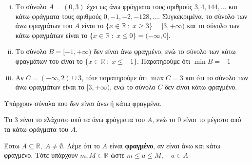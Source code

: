 \begin{example}
\item {}
  \begin{enumerate}[(i)]
    \item Το  σύνολο $ A = (0,3) $  έχει ως άνω φράγματα τους αριθμούς 
      $ 3, 4, 144, \ldots$ και κάτω φράγματα τους αριθμούς
      $ 0, -1, -2, -128, \ldots $. Συγκεκριμένα, το σύνολο των άνω φραγμάτων του 
      $A$ είναι το $ \{ x \in \mathbb{R} \; : \; x \geq 3 \} = [3,+\infty) $ και 
      το σύνολο των κάτω φραγμάτων είναι το 
      $ \{ x \in \mathbb{R} \; : \; x \leq 0 \} = (-\infty,0] $.

    \item Το σύνολο $ B = [-1,+\infty) $ δεν είναι άνω φραγμένο, ενώ το σύνολο των 
      κάτω φραγμάτων του είναι το $ \{ x \in \mathbb{R} \; : \; x \leq -1 \} $. 
      Παρατηρούμε ότι $ \min B =-1 $ 

    \item Αν $ C= (-\infty,2) \cup {3} $, τότε παρατηρούμε ότι $ \max C = 3 $ και ότι 
      το σύνολο των άνω φραγμάτων είναι το $[3,+\infty) $, ενώ το σύνολο $C$ δεν είναι 
      κάτω φραγμένο.
  \end{enumerate}
\end{example}

\begin{rem}
\item {}
  \begin{myitemize}
    \item Υπάρχουν σύνολα που δεν είναι άνω ή κάτω φραγμένα.
    \item Το  $ 3 $ είναι το ελάχιστο από τα άνω φράγματα του $A$, ενώ το $ 0
      $ είναι το μέγιστο από τα κάτω φράγματα του $A$. 
  \end{myitemize}
\end{rem}


\begin{mybox1}
\begin{dfn}
  Έστω $ A \subseteq \mathbb{R}, \; A \neq \emptyset $. Λέμε ότι το $A$ 
  είναι \textbf{φραγμένο}, αν είναι άνω και κάτω φραγμένο. 
  Τότε υπάρχουν $ m,M \in \mathbb{R} $ ώστε $ m \leq a \leq M, \quad a \in A $ 
\end{dfn}
\end{mybox1}

